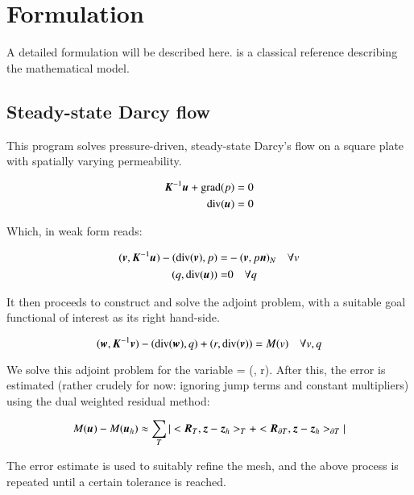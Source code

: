 \section{Formulation}
\label{formulation}

A detailed formulation will be described here. \cite{allen:1985} is a
classical reference describing the mathematical model.

\subsection{Steady-state Darcy flow}
\label{darcy-flow}

This program solves pressure-driven, steady-state Darcy's flow on a
square plate with spatially varying permeability.

\begin{equation}
\begin{split}
\mbox{\boldmath$ K$}^{-1}\mbox{\boldmath$ u$} + \mathrm{grad}(p) & = 0\\
\mathrm{div}(\mbox{\boldmath$ u$}) & = 0
\end{split}
\end{equation}

Which, in weak form reads:

\begin{equation}
\begin{split}
(\mbox{\boldmath$ v$}, \mbox{\boldmath$ K$}^{-1}\mbox{\boldmath$ u$}) - (\mathrm{div}(\mbox{\boldmath$ v$}), p) = & - (\mbox{\boldmath$ v$}, p\mbox{\boldmath$ n$})_N \quad\forall v \\
(q, \mathrm{div}(\mbox{\boldmath$ u$})) = & 0 \quad\forall q
\end{split}
\end{equation}

It then proceeds to construct and solve the adjoint problem, with a
suitable goal functional of interest as its right hand-side.

\begin{equation}
(\mbox{\boldmath$ w$}, \mbox{\boldmath$ K$}^{-1}\mbox{\boldmath$ v$}) - (\mathrm{div}(\mbox{\boldmath$ w$}), q) + (r, \mathrm{div}(\mbox{\boldmath$ v$})) = M(v) \quad\forall
v, q
\end{equation}

We solve this adjoint problem for the variable \bz{} = (\bw, r). After
this, the error is estimated (rather crudely for now: ignoring jump
terms and constant multipliers) using the dual weighted residual
method:

\begin{equation}
M(\mbox{\boldmath$ u$}) - M(\mbox{\boldmath$ u$}_h) \approx  \sum_T |<\mbox{\boldmath$ R$}_T, \mbox{\boldmath$ z$} - \mbox{\boldmath$ z$}_h>_T + <\mbox{\boldmath$ R$}_{\partial T}, \mbox{\boldmath$ z$} - \mbox{\boldmath$ z$}_h>_{\partial T}|
\end{equation}

The error estimate is used to suitably refine the mesh, and the above
process is repeated until a certain tolerance is reached.

